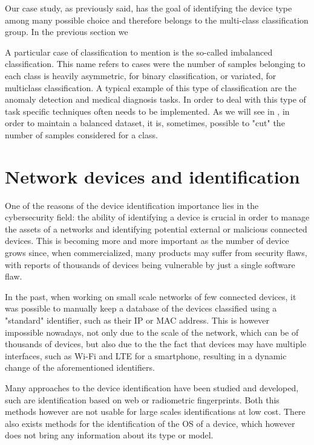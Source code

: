 Our case study, as previously said, has the goal of identifying the device type among many possible choice and therefore belongs to the multi-class classification group.
In the previous section we 

A particular case of classification to mention is the so-called imbalanced classification. This name refers to cases were the number of samples belonging to each class is heavily asymmetric, for binary classification, or variated, for multiclass classification. A typical example of this type of classification are the anomaly detection and medical diagnosis tasks. In order to deal with this type of task specific techniques often needs to be implemented\cite{imbclasf}. As we will see in , in order to maintain a balanced dataset, it is, sometimes, possible to "cut" the number of samples considered for a class.




\section{Network devices and identification}\label{identification}

One of the reasons of the device identification importance lies in the cybersecurity field: the ability of identifying a device is crucial in order to manage the assets of a networks and identifying potential external or malicious connected devices. This is becoming more and more important as the number of device grows since, when commercialized, many products may suffer from security flaws\cite{attk1, attk2}, with  reports of thousands of devices being vulnerable by just a single software flaw\cite{flaw}.

In the past, when working on small scale networks of few connected devices, it was possible to manually keep a database of the devices classified using a "standard" identifier, such as their IP or MAC address. This is however impossible nowadays, not only due to the scale of the network, which can be of thousands of devices, but also due to the the fact that devices may have multiple interfaces, such as Wi-Fi and LTE for a smartphone, resulting in a dynamic change of the aforementioned identifiers.

Many approaches to the device identification have been studied and developed, such are identification based on web\cite{webfingerprint1, webfingerprint2} or radiometric\cite{radiofingerprint} fingerprints. Both this methods however are not usable for large scales identifications at low cost. There also exists methods for  the identification of the OS of a device\cite{idos1, idos2}, which however does not bring any information about its type or model.

